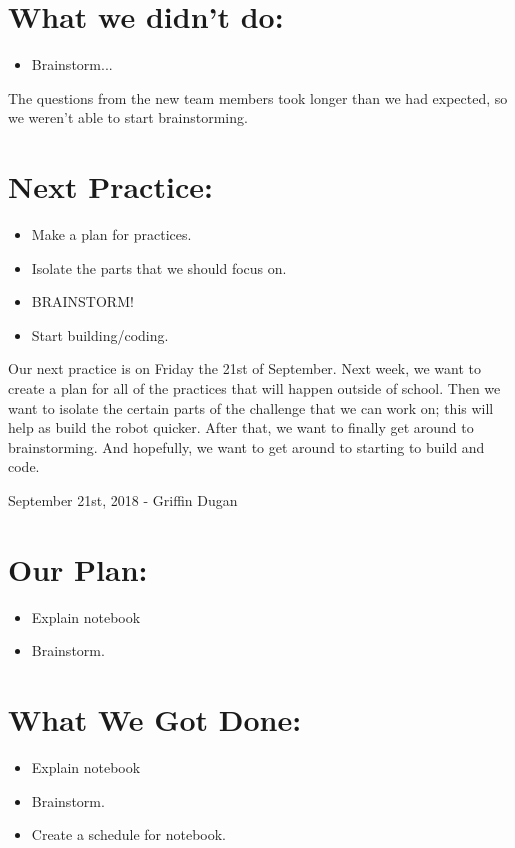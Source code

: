 \documentclass[12pt]{article}
\begin{document}
\section{What we didn't do:}
\begin{itemize}
	\item Brainstorm...
\end{itemize}

The questions from the new team members took longer than we had expected, so we weren't able to start brainstorming. 

\section{Next Practice:}
\begin{itemize}
	\item Make a plan for practices.
	\item Isolate the parts that we should focus on.
	\item BRAINSTORM!
	\item Start building/coding.
\end{itemize}

Our next practice is on Friday the 21st of September. Next week, we want to create a plan for all of the practices that will happen outside of school. Then we want to isolate the certain parts of the challenge that we can work on; this will help as build the robot quicker. After that, we want to finally get around to brainstorming. And hopefully, we want to get around to starting to build and code.

\newpage
\setcounter{section}{0}

September 21st, 2018 - Griffin Dugan

\section{Our Plan:}
\begin{itemize}
	\item Explain notebook
	\item Brainstorm.
\end{itemize}



\section{What We Got Done:}
\begin{itemize}
	\item Explain notebook
	\item Brainstorm.
	\item Create a schedule for notebook.
\end{itemize}
\end{document}
